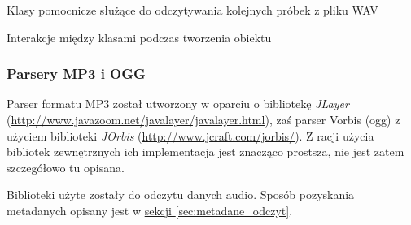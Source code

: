 {Klasy pomocnicze służące do odczytywania kolejnych próbek z pliku WAV}

{Interakcje między klasami podczas tworzenia obiektu }


\subsubsection{Parsery MP3 i OGG}

Parser formatu MP3 został utworzony w oparciu o bibliotekę
\emph{JLayer} (\url{http://www.javazoom.net/javalayer/javalayer.html}), zaś parser Vorbis (ogg) z
użyciem biblioteki \emph{JOrbis} (\url{http://www.jcraft.com/jorbis/}). Z racji użycia bibliotek
zewnętrznych ich implementacja jest znacząco prostsza, nie jest zatem szczegółowo tu opisana.

Biblioteki użyte zostały do odczytu danych audio. Sposób pozyskania metadanych opisany jest w
\hyperref[sec:metadane_odczyt]{sekcji \ref*{sec:metadane_odczyt}}.




